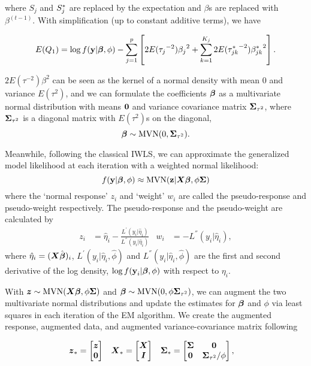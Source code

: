 \documentclass[]{article}
\begin{document}
where \(S_j\) and \(S_j^*\) are replaced by the expectation and
\(\beta\)s are replaced with \(\beta^{(t-1)}\). With simplification (up
to constant additive terms), we have

\begin{equation}\label{eq:EQ1_IWLS}
E(Q_1) = \log f(\textbf{y}|\boldsymbol{\beta}, \phi) - \sum\limits_{j=1}^p\left[ {2E({\tau_j}^{-2})}{\beta_j}^2 +\sum\limits_{k=1}^{K_j} {2E({\tau_{jk}^*}^{-2})}{\beta_{jk}^*}^2\right].
\end{equation}

\(2E({\tau}^{-2})\beta^2\) can be seen as the kernel of a normal density
with mean 0 and variance \(E(\tau^{2})\), and we can formulate the
coefficients \(\boldsymbol{\beta}\) as a multivariate normal distribution with
means \(\boldsymbol{0}\) and variance covariance matrix \(\boldsymbol{\Sigma}_{\tau^2}\),
where \(\boldsymbol{\Sigma}_{\tau^2}\) is a diagonal matrix with \(E(\tau^2)\)s
on the diagonal, \[
\boldsymbol{\beta} \sim \text{MVN}(0, \boldsymbol{\Sigma}_{\tau^2}).
\]

Meanwhile, following the classical IWLS, we can approximate the
generalized model likelihood at each iteration with a weighted normal
likelihood: \[
f(\textbf{y}|\boldsymbol{\beta}, \phi) \approx \text{MVN}(\textbf{z}|\boldsymbol{X} \boldsymbol{\beta}, \phi\boldsymbol{\Sigma} )
\] where the `normal response' \(z_i\) and `weight' \(w_i\) are called
the pseudo-response and pseudo-weight respectively. The pseudo-response
and the pseudo-weight are calculated by \[
\begin{aligned}
z_i &= \hat\eta_i - \frac{L^{'}(y_i|\hat\eta_i)}{L^{''}(y_i|\hat\eta_i)}& w_i &= - L^{''}(y_i|\hat\eta_i),
\end{aligned}
\] where \(\hat\eta_i = (\boldsymbol{X} {\hat{\boldsymbol{\beta}}})_i\),
\(L^{'}(y_i|\hat\eta_i, \hat \phi)\) and
\(L^{''}(y_i|\hat\eta_i, \hat \phi)\) are the first and second
derivative of the log density, \(\log f(\textbf{y}_i|\boldsymbol{\beta}, \phi)\)
with respect to \(\eta_i\).

With \(\boldsymbol{z}\sim \text{MVN}(\boldsymbol{X} \boldsymbol{\beta}, \phi \boldsymbol{\Sigma})\) and
\(\boldsymbol{\beta} \sim \text{MVN}(0, \phi \boldsymbol{\Sigma}_{\tau^2})\), we can
augment the two multivariate normal distributions and update the
estimates for \(\boldsymbol{\beta}\) and \(\phi\) via least squares in each
iteration of the EM algorithm. We create the augmented response,
augmented data, and augmented variance-covariance matrix following

\begin{align*}
& \boldsymbol{z}_* = \begin{bmatrix} \boldsymbol{z}\\ \boldsymbol{0}\end{bmatrix} &&
  \boldsymbol{X}_* = \begin{bmatrix} \boldsymbol{X} \\ \boldsymbol{I} \end{bmatrix} &&
  \boldsymbol{\Sigma}_* = \begin{bmatrix} \boldsymbol{\Sigma} & \boldsymbol{0}  \\ \boldsymbol{0} & \boldsymbol{\Sigma}_{\tau^2}/\phi \end{bmatrix}, &
\end{align*}
\end{document}
